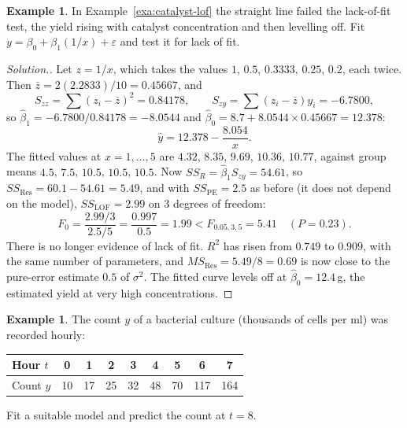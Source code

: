 \documentclass[11pt,a4paper]{article}
\numberwithin{equation}{section}
\theoremstyle{definition}
\newtheorem{exa}[thm]{Example}
\newenvironment{solution}
  {\renewcommand{\qedsymbol}{}\begin{proof}[\textit{Solution}.]}
  {\end{proof}}
\begin{document}
\begin{exa}\label{exa:catalyst-recip}
In Example~\ref{exa:catalyst-lof} the straight line failed the lack-of-fit test, the yield
rising with catalyst concentration and then levelling off. Fit $y = \beta_0 + \beta_1(1/x) + \varepsilon$
and test it for lack of fit.
\end{exa}

\begin{solution}
Let $z = 1/x$, which takes the values $1$, $0.5$, $0.3333$, $0.25$, $0.2$, each twice. Then
$\bar z = 2(2.2833)/10 = 0.45667$, and
\[
S_{zz} = \sum(z_i - \bar z)^2 = 0.84178, \qquad
S_{zy} = \sum(z_i - \bar z)y_i = -6.7800 ,
\]
so $\hat\beta_1 = -6.7800/0.84178 = -8.0544$ and $\hat\beta_0 = 8.7 + 8.0544 \times 0.45667 = 12.378$:
\[
\hat y = 12.378 - \frac{8.054}{x} .
\]
The fitted values at $x = 1, \dots, 5$ are $4.32$, $8.35$, $9.69$, $10.36$, $10.77$, against group means
$4.5$, $7.5$, $10.5$, $10.5$, $10.5$. Now $SS_R = \hat\beta_1 S_{zy} = 54.61$, so
$SS_{\mathrm{Res}} = 60.1 - 54.61 = 5.49$, and with $SS_{\mathrm{PE}} = 2.5$ as before (it does not
depend on the model), $SS_{\mathrm{LOF}} = 2.99$ on $3$ degrees of freedom:
\[
F_0 = \frac{2.99/3}{2.5/5} = \frac{0.997}{0.5} = 1.99 < F_{0.05,3,5} = 5.41 \quad (P = 0.23) .
\]
There is no longer evidence of lack of fit. $R^2$ has risen from $0.749$ to $0.909$, with the
same number of parameters, and $MS_{\mathrm{Res}} = 5.49/8 = 0.69$ is now close to the pure-error
estimate $0.5$ of $\sigma^2$. The fitted curve levels off at $\hat\beta_0 = 12.4$\,g, the estimated
yield at very high concentrations.
\end{solution}

\begin{exa}\label{exa:bacteria}
The count $y$ of a bacterial culture (thousands of cells per ml) was recorded hourly:
\begin{center}
\begin{tabular}{l|cccccccc}
Hour $t$ & 0 & 1 & 2 & 3 & 4 & 5 & 6 & 7 \\
\hline
Count $y$ & 10 & 17 & 25 & 32 & 48 & 70 & 117 & 164 \\
\end{tabular}
\end{center}
Fit a suitable model and predict the count at $t = 8$.
\end{exa}
\end{document}
